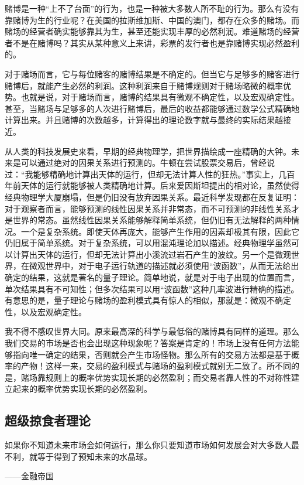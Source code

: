 赌博是一种“上不了台面”的行为，也是一种被大多数人所不耻的行为。那么有没有靠赌博为生的行业呢？在美国的拉斯维加斯、中国的澳门，都存在众多的赌场。而赌场的经营者确实能够靠其为生，甚至还能实现丰厚的必然利润。难道赌场的经营者不是在赌博吗？其实从某种意义上来讲，彩票的发行者也是靠赌博实现必然盈利的。

对于赌场而言，它与每位赌客的赌博结果是不确定的。但当它与足够多的赌客进行赌博后，就能产生必然的利润。这种利润来自于赌博规则对于赌场略微的概率优势。也就是说，对于赌场而言，赌博的结果具有微观不确定性，以及宏观确定性。甚至，当赌场与足够多的人次进行赌博后，最后的收益都能够通过数学公式精确地计算出来。并且赌博的次数越多，计算得出的理论数字就与最终的实际结果越接近。

从人类的科技发展史来看，早期的经典物理学，把世界描绘成一座精确的大钟。未来是可以通过绝对的因果关系进行预测的。牛顿在尝试股票交易后，曾经说过：“我能够精确地计算出天体的运行，但却无法计算人性的狂热。”事实上，几百年前天体的运行就能够被人类精确地计算。后来爱因斯坦提出的相对论，虽然使得经典物理学大厦崩塌，但是仍旧没有放弃因果关系。最近科学发现都在反复证明：对于观察者而言，能够预测的线性因果关系并非常态，而不可预测的非线性关系才是世界的常态。虽然线性因果关系能够解释简单系统，但仍旧有无法解释的两种情况。一个是复杂系统。即使天体再庞大，能够产生作用的因素却极其有限，因此它仍旧属于简单系统。对于复杂系统，可以用混沌理论加以描述。经典物理学虽然可以计算出天体的运行，但却无法计算出小溪流过岩石产生的波纹。另一个是微观世界，在微观世界中，对于电子运行轨道的描述就必须使用“波函数”，从而无法给出确定的结果，这就是著名的量子理论。简单地说，就是对于电子出现的位置而言，单次结果具有不可知性；但多次结果可以用“波函数”这种几率波进行精确的描述。有意思的是，量子理论与赌场的盈利模式具有惊人的相似，那就是：微观不确定性，以及宏观确定性。

我不得不感叹世界大同。原来最高深的科学与最低俗的赌博具有同样的道理。那么我们交易的市场是否也会出现这种现象呢？答案是肯定的！市场上没有任何方法能够指向唯一确定的结果，否则就会产生市场怪物。那么所有的交易方法都是基于概率的产物！这样一来，交易的盈利模式与赌场的盈利模式就别无二致了。所不同的是，赌场靠规则上的概率优势实现长期的必然盈利；而交易者靠人性的不对称性建立起来的概率优势实现长期的必然盈利。

\subsection{超级掠食者理论}

{\kaishu
如果你不知道未来市场会如何运行，那么你只要知道市场如何发展会对大多数人最不利，就等于得到了预知未来的水晶球。

\hfill ——金融帝国
}

